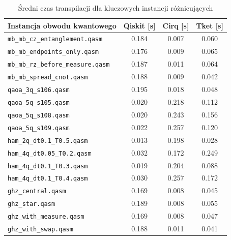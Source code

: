 \begin{table}
    \centering
    \caption{Średni czas transpilacji dla kluczowych instancji różnicujących}
    \label{table:anomalies_time}
    \begin{tabular}{l@{\hspace{8pt}}c@{\hspace{8pt}}c@{\hspace{8pt}}c}
        \toprule
        \textbf{Instancja obwodu kwantowego} & \textbf{Qiskit} [s] & \textbf{Cirq} [s] & \textbf{Tket} [s] \\
        \midrule
        \texttt{mb\_mb\_cz\_entanglement.qasm} & {0.184} & {0.007} & {0.060} \\
        \texttt{mb\_mb\_endpoints\_only.qasm} & {0.176} & {0.009} & {0.065} \\
        \texttt{mb\_mb\_rz\_before\_measure.qasm} & {0.187} & {0.011} & {0.064} \\
        \texttt{mb\_mb\_spread\_cnot.qasm} & {0.188} & {0.009} & {0.042} \\
        \texttt{qaoa\_3q\_s106.qasm} & {0.195} & {0.018} & {0.048} \\
        \texttt{qaoa\_5q\_s105.qasm} & {0.020} & {0.218} & {0.112} \\
        \texttt{qaoa\_5q\_s108.qasm} & {0.020} & {0.243} & {0.156} \\
        \texttt{qaoa\_5q\_s109.qasm} & {0.022} & {0.257} & {0.120} \\
        \texttt{ham\_2q\_dt0.1\_T0.5.qasm} & {0.013} & {0.198} & {0.028} \\
        \texttt{ham\_4q\_dt0.05\_T0.2.qasm} & {0.032} & {0.172} & {0.249} \\
        \texttt{ham\_4q\_dt0.1\_T0.3.qasm} & {0.019} & {0.204} & {0.088} \\
        \texttt{ham\_4q\_dt0.1\_T0.4.qasm} & {0.030} & {0.257} & {0.172} \\
        \texttt{ghz\_central.qasm} & {0.169} & {0.008} & {0.045} \\
        \texttt{ghz\_star.qasm} & {0.189} & {0.008} & {0.055} \\
        \texttt{ghz\_with\_measure.qasm} & {0.169} & {0.008} & {0.047} \\
        \texttt{ghz\_with\_swap.qasm} & {0.188} & {0.011} & {0.041} \\
        \bottomrule
    \end{tabular}
\end{table}

